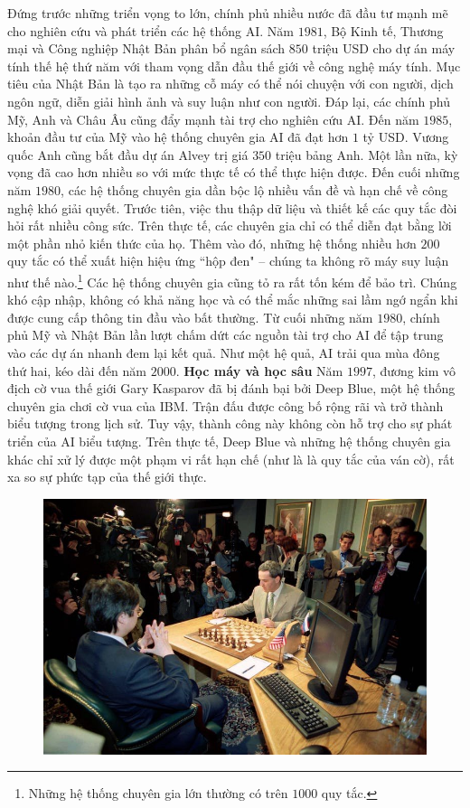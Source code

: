 \begin{multicols}{2}
	\vskip 0.1cm
	Đứng trước những triển vọng to lớn, chính phủ nhiều nước đã đầu tư mạnh mẽ cho nghiên cứu và phát triển các hệ thống AI. Năm $1981$, Bộ Kinh tế, Thương mại và Công nghiệp Nhật Bản phân bổ ngân sách $850$ triệu USD cho dự án máy tính thế hệ thứ năm với tham vọng dẫn đầu thế giới về công nghệ máy tính. Mục tiêu của Nhật Bản là tạo ra những cỗ máy có thể nói chuyện với con người, dịch ngôn ngữ, diễn giải hình ảnh và suy luận như con người. Đáp lại, các chính phủ Mỹ, Anh và Châu Âu cũng đẩy mạnh tài trợ cho nghiên cứu AI. Đến năm $1985$, khoản đầu tư của Mỹ vào hệ thống chuyên gia AI đã đạt hơn $1$ tỷ USD. Vương quốc Anh cũng bắt đầu dự án Alvey trị giá $350$ triệu bảng Anh.
	\vskip 0.1cm
	Một lần nữa, kỳ vọng đã cao hơn nhiều so với mức thực tế có thể thực hiện được. Đến cuối những năm $1980$, các hệ thống chuyên gia dần bộc lộ nhiều vấn đề và hạn chế về công nghệ khó giải quyết. Trước tiên, việc thu thập dữ liệu và thiết kế các quy tắc đòi hỏi rất nhiều công sức. Trên thực tế, các chuyên gia chỉ có thể diễn đạt bằng lời một phần nhỏ kiến thức của họ. Thêm vào đó, những hệ thống nhiều hơn $200$ quy tắc có thể xuất hiện hiệu ứng ``hộp đen" -- chúng ta không rõ máy suy luận như thế nào.\footnote{\color{cackithi}Những hệ thống chuyên gia lớn thường có trên $1000$ quy tắc.} Các hệ thống chuyên gia cũng tỏ ra rất tốn kém để bảo trì. Chúng khó cập nhập, không có khả năng học và có thể mắc những sai lầm ngớ ngẩn khi được cung cấp thông tin đầu vào bất thường. 
	\vskip 0.1cm
	Từ cuối những năm $1980$, chính phủ Mỹ và Nhật Bản lần lượt chấm dứt các nguồn tài trợ cho AI để tập trung vào các dự án nhanh đem lại kết quả. Như một hệ quả, AI trải qua mùa đông thứ hai, kéo dài đến năm $2000$.
	\vskip 0.1cm
	\textbf{\color{cackithi}Học máy và học sâu}
	\vskip 0.1cm
	Năm $1997$, đương kim vô địch cờ vua thế giới Gary Kasparov đã bị đánh bại bởi Deep Blue, một hệ thống chuyên gia chơi cờ vua của IBM. Trận đấu được công bố rộng rãi và trở thành biểu tượng trong lịch sử. Tuy vậy, thành công này không còn hỗ trợ cho sự phát triển của AI biểu tượng. Trên thực tế, Deep Blue và những hệ thống chuyên gia khác chỉ xử lý được một phạm vi rất hạn chế (như là là quy tắc của ván cờ), rất xa so sự phức tạp của thế giới thực.
	\begin{figure}[H]
		\vspace*{-5pt}
		\centering
		\captionsetup{labelformat= empty, justification=centering}
		\includegraphics[width= 1\linewidth]{DeepBlue.jpg}

\end{figure}
\end{multicols}
